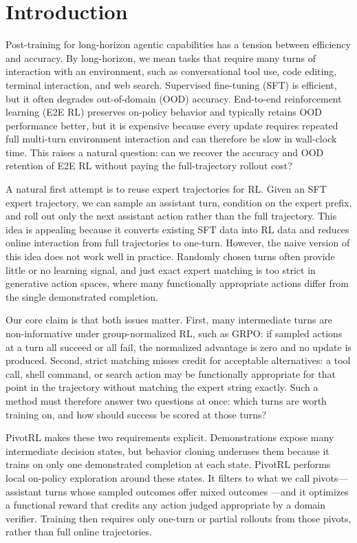 \section{Introduction}
\label{sec:intro}

Post-training for long-horizon agentic capabilities has a tension between efficiency and accuracy. By long-horizon, we mean tasks that require many turns of interaction with an environment, such as conversational tool use, code editing, terminal interaction, and web search. Supervised fine-tuning (SFT) is efficient, but it often degrades out-of-domain (OOD) accuracy. End-to-end reinforcement learning (E2E RL) preserves on-policy behavior and typically retains OOD performance better, but it is expensive because every update requires repeated full multi-turn environment interaction and can therefore be slow in wall-clock time. This raises a natural question: can we recover the accuracy and OOD retention of E2E RL without paying the full-trajectory rollout cost?

A natural first attempt is to reuse expert trajectories for RL. Given an SFT expert trajectory, we can sample an assistant turn, condition on the expert prefix, and roll out only the next assistant action rather than the full trajectory. This idea is appealing because it converts existing SFT data into RL data and reduces online interaction from full trajectories to one-turn. However, the naive version of this idea does not work well in practice. Randomly chosen turns often provide little or no learning signal, and just exact expert matching is too strict in generative action spaces, where many functionally appropriate actions differ from the single demonstrated completion.

Our core claim is that both issues matter. First, many intermediate turns are non-informative under group-normalized RL, such as GRPO: if sampled actions at a turn all succeed or all fail, the normalized advantage is zero and no update is produced. Second, strict matching misses credit for acceptable alternatives: a tool call, shell command, or search action may be functionally appropriate for that point in the trajectory without matching the expert string exactly. Such a method must therefore answer two questions at once: which turns are worth training on, and how should success be scored at those turns?

PivotRL makes these two requirements explicit. Demonstrations expose many intermediate decision states, but behavior cloning underuses them because it trains on only one demonstrated completion at each state. PivotRL performs local on-policy exploration around these states. It filters to what we call pivots---assistant turns whose sampled outcomes offer mixed outcomes ---and it optimizes a functional reward that credits any action judged appropriate by a domain verifier. Training then requires only one-turn or partial rollouts from those pivots, rather than full online trajectories.

